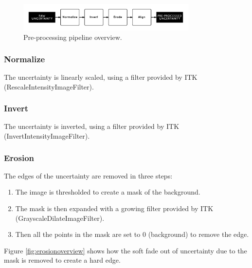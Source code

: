 \begin{figure}[H]
  \centering
  \includegraphics[width=0.8\textwidth]{images/pre-process_pipeline.png}
  \caption{Pre-processing pipeline overview.}
  \label{fig:preprocesspipeline}
\end{figure}

\subsubsection*{Normalize}
The uncertainty is linearly scaled, using a filter provided by ITK (RescaleIntensityImageFilter).

\subsubsection*{Invert}
The uncertainty is inverted, using a filter provided by ITK (InvertIntensityImageFilter).

\subsubsection*{Erosion}
The edges of the uncertainty are removed in three steps:

\begin{enumerate}
  \item The image is thresholded to create a mask of the background.
  \item The mask is then expanded with a growing filter provided by ITK (GrayscaleDilateImageFilter).
  \item Then all the points in the mask are set to 0 (background) to remove the edge.
\end{enumerate}

Figure \ref{fig:erosionoverview} shows how the soft fade out of uncertainty due to the mask is removed to create a hard edge.

